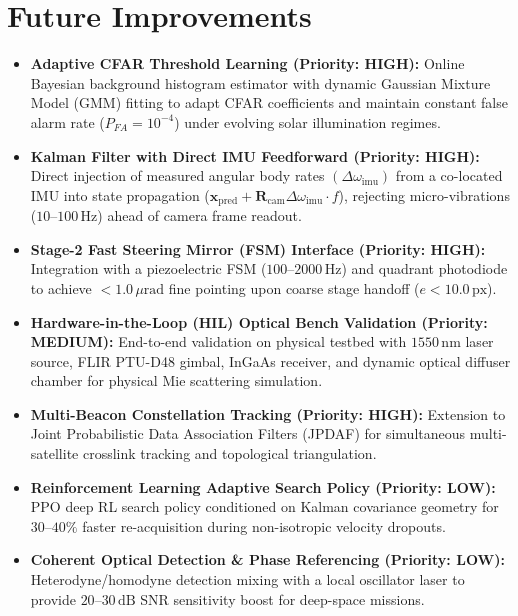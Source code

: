 \documentclass[11pt,a4paper]{article}
\begin{document}
\FloatBarrier

\section{Future Improvements}
\begin{itemize}[noitemsep,topsep=2pt,leftmargin=1.2em]
    \item \textbf{Adaptive CFAR Threshold Learning (Priority: HIGH):} Online Bayesian background histogram estimator with dynamic Gaussian Mixture Model (GMM) fitting to adapt CFAR coefficients and maintain constant false alarm rate ($P_{FA} = 10^{-4}$) under evolving solar illumination regimes.
    \item \textbf{Kalman Filter with Direct IMU Feedforward (Priority: HIGH):} Direct injection of measured angular body rates $(\Delta\omega_{\text{imu}})$ from a co-located IMU into state propagation ($\mathbf{x}_{\text{pred}} + \mathbf{R}_{\text{cam}}\Delta\omega_{\text{imu}} \cdot f$), rejecting micro-vibrations ($10$--$100\,\text{Hz}$) ahead of camera frame readout.
    \item \textbf{Stage-2 Fast Steering Mirror (FSM) Interface (Priority: HIGH):} Integration with a piezoelectric FSM ($100$--$2000\,\text{Hz}$) and quadrant photodiode to achieve $< 1.0\,\mu\text{rad}$ fine pointing upon coarse stage handoff ($e < 10.0\,\text{px}$).
    \item \textbf{Hardware-in-the-Loop (HIL) Optical Bench Validation (Priority: MEDIUM):} End-to-end validation on physical testbed with $1550\,\text{nm}$ laser source, FLIR PTU-D48 gimbal, InGaAs receiver, and dynamic optical diffuser chamber for physical Mie scattering simulation.
    \item \textbf{Multi-Beacon Constellation Tracking (Priority: HIGH):} Extension to Joint Probabilistic Data Association Filters (JPDAF) for simultaneous multi-satellite crosslink tracking and topological triangulation.
    \item \textbf{Reinforcement Learning Adaptive Search Policy (Priority: LOW):} PPO deep RL search policy conditioned on Kalman covariance geometry for $30$--$40\%$ faster re-acquisition during non-isotropic velocity dropouts.
    \item \textbf{Coherent Optical Detection \& Phase Referencing (Priority: LOW):} Heterodyne/homodyne detection mixing with a local oscillator laser to provide $20$--$30\,\text{dB}$ SNR sensitivity boost for deep-space missions.
\end{itemize}
\end{document}
